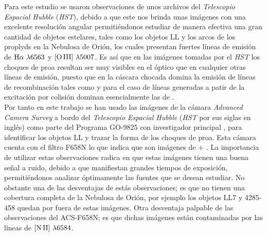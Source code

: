 % 



% 


\label{chap:datos}

Para este estudio se usaron observaciones de unos archivos del \textit{Telescopio Espacial Hubble} (\textit{HST}), debido a que este nos brinda unas imágenes con una excelente resolución angular permitiéndonos estudiar de manera efectiva una gran cantidad de objetos estelares, tales como los objetos LL y los arcos de los proplyds en la Nebulosa de Orión, los cuales  presentan fuertes líneas de emisión de \(\mathrm{H}\alpha{}~\lambda6563\) y \(\mathrm{[O\,III]}{}~\lambda5007\). Es así que en las  imágenes tomadas por el \textit{HST} los choques de proa resultan ser muy visibles en el óptico que en cualquier otras líneas de emisión, puesto que en la cáscara chocada domina la emisión de líneas de recombinación tales como \ha{} y para el caso de líneas generadas a patir de la excitación por colisión dominan esencialmente las de \oiii{}.\\ 

 Por tanto en este trabajo se han usado las imágenes de la cámara \textit{Advanced Camera Survey} a bordo del \textit{Telescopio Espacial Hubble} (\textit{HST} por sus siglas en inglés) como parte del Programa GO-9825 con investigador principal \citet{Bally:2006a}, para identificar los objetos LL y trazar la forma de los choques de proa. Esta cámara cuenta con el filtro F658N lo que indica que son imágenes de \ha{} + \nii{}. La importancia de utilizar estas observaciones radica en que estas imágenes tienen una  buena señal a ruido, debido a que manifiestan grandes tiempos de exposición, permitiéndonos analizar óptimamente las fuentes que se desean estudiar. No obstante una de las desventajas de estás observaciones; es que no tienen una cobertura completa de la Nebulosa de Orión, por ejemplo los objetos LL7 y 4285-458 quedan por fuera de estas imágenes. Otra desventaja palpable de las observaciones del ACS-F658N; es que dichas imágenes están contaminadas por las líneas de \(\mathrm{[N\,II]}{}~\lambda6584\).\\

